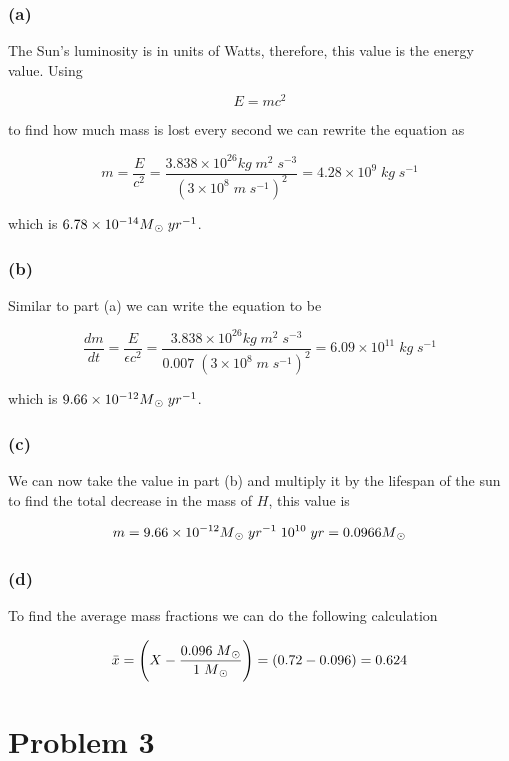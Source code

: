 \documentclass[11pt]{article}
\begin{document}
\subsubsection*{(a)}

The Sun's luminosity is in units of Watts, therefore, this value is the energy value. Using 

$$
E = mc^{2}
$$

to find how much mass is lost every second we can rewrite the equation as

$$
m = \frac{E}{c^{2}} = \frac{3.838 \times 10^{26} kg \; m^{2} \; s^{-3}}{(3 \times 10^{8} \; m \; s^{-1})^{2}} = 4.28 \times 10^{9} \; kg \; s^{-1}
$$

which is $6.78 \times 10^{-14} M\textsubscript{\(\odot\)} \; yr^{-1}$.

\subsubsection*{(b)}

Similar to part (a) we can write the equation to be 

$$
\frac{dm}{dt} = \frac{E}{\epsilon c^{2}} = \frac{3.838 \times 10^{26} kg \; m^{2} \; s^{-3}}{0.007 \; (3 \times 10^{8} \; m \; s^{-1})^{2}} = 6.09 \times 10^{11} \; kg \; s^{-1}
$$

which is $9.66 \times 10^{-12} M\textsubscript{\(\odot\)} \; yr^{-1}$.

\subsubsection*{(c)}

We can now take the value in part (b) and multiply it by the lifespan of the sun to find the total decrease in the mass of $H$, this value is

$$
m = 9.66 \times 10^{-12} M\textsubscript{\(\odot\)} \; yr^{-1} \; 10^{10} \; yr = 0.0966  M\textsubscript{\(\odot\)}
$$

\subsubsection*{(d)}

To find the average mass fractions we can do the following calculation

$$
\bar{x} = \Bigg(X - \frac{0.096 \; M\textsubscript{\(\odot\)}}{1 \; M\textsubscript{\(\odot\)}}\Bigg) = (0.72 - 0.096) = 0.624
$$
\clearpage

\section*{Problem 3}
\end{document}
